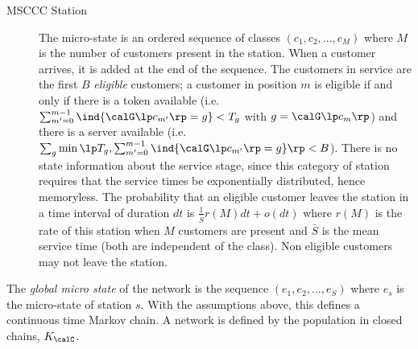 \begin{petit}
\begin{description}
\item[MSCCC Station] The micro-state is an
ordered sequence of classes $(c_1, c_2, ...,
c_M)$ where $M$ is the number of customers
present in the station. When a customer arrives,
it is added at the end of the sequence. The
customers in service are the first $B$
\emph{eligible} customers; a customer in position
$m$ is eligible if and only if there is a token
available
 (i.e. $\sum_{m'=0}^{m-1}\ind{\calG\lp c_{m'}\rp =g}<T_g$ with $g=\calG\lp c_{m}\rp$)
  and there
 is a server available (i.e.
 $\sum_g \min\lp T_g,\sum_{m'=0}^{m-1}\ind{\calG\lp c_{m'}\rp
 =g}\rp<B
 $). There is no state information about the
 service stage, since this category of station
 requires that the service times be exponentially
 distributed, hence memoryless. The probability
 that
 an eligible customer leaves the station in a time interval of duration
$dt$ is $\frac{1}{\bar{S}} r(M)dt + o(dt)$ where
$r(M)$ is the rate of this station when $M$
customers are present and $\bar{S}$ is the mean
service time (both are independent of the
class). Non eligible customers may not leave the station.
%
%
 \end{description}
 The \emph{global micro state} of the network is the
 sequence $(e_1, e_2, ..., e_S)$ where $e_s$ is
 the micro-state of station $s$. With the
 assumptions above, this defines a continuous
 time Markov chain. A network is defined by the population
 in closed chains, $K_{\calC}$.

\end{petit}

